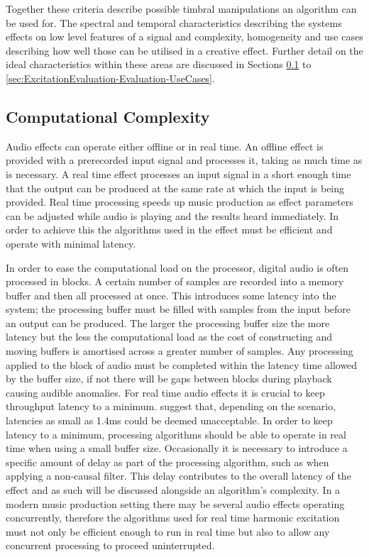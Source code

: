 	Together these criteria describe possible timbral manipulations an algorithm can be used for. The spectral and
	temporal characteristics describing the systems effects on low level features of a signal and complexity,
	homogeneity and use cases describing how well those can be utilised in a creative effect. Further detail on the
	ideal characteristics within these areas are discussed in Sections
	\ref{sec:ExcitationEvaluation-Evaluation-Complexity} to \ref{sec:ExcitationEvaluation-Evaluation-UseCases}.

	\subsection{Computational Complexity}
	\label{sec:ExcitationEvaluation-Evaluation-Complexity}
		Audio effects can operate either offline or in real time. An offline effect is provided with a prerecorded
		input signal and processes it, taking as much time as is necessary. A real time effect processes an input
		signal in a short enough time that the output can be produced at the same rate at which the input is being
		provided. Real time processing speeds up music production as effect parameters can be adjusted while audio
		is playing and the results heard immediately. In order to achieve this the algorithms used in the effect
		must be efficient and operate with minimal latency. 

		In order to ease the computational load on the processor, digital audio is often processed in blocks.  A
		certain number of samples are recorded into a memory buffer and then all processed at once. This introduces
		some latency into the system; the processing buffer must be filled with samples from the input before an
		output can be produced. The larger the processing buffer size the more latency but the less the
		computational load as the cost of constructing and moving buffers is amortised across a greater number of
		samples. Any processing applied to the block of audio must be completed within the latency time allowed by
		the buffer size, if not there will be gaps between blocks during playback causing audible anomalies. For
		real time audio effects it is crucial to keep throughput latency to a minimum. \citet{lester2007the}
		suggest that, depending on the scenario, latencies as small as 1.4ms could be deemed unacceptable. In order
		to keep latency to a minimum, processing algorithms should be able to operate in real time when using a
		small buffer size.  Occasionally it is necessary to introduce a specific amount of delay as part of the
		processing algorithm, such as when applying a non-causal filter. This delay contributes to the overall
		latency of the effect and as such will be discussed alongside an algorithm's complexity.  In a modern music
		production setting there may be several audio effects operating concurrently, therefore the algorithms used
		for real time harmonic excitation must not only be efficient enough to run in real time but also to allow
		any concurrent processing to proceed uninterrupted.

